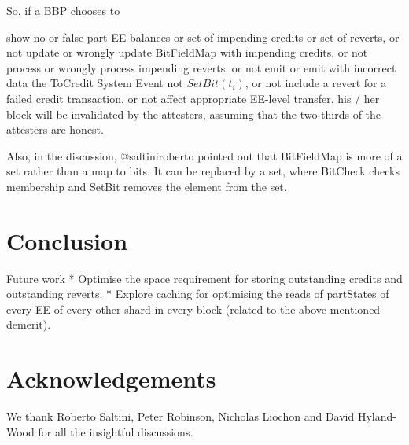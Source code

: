 \documentclass{article}
\begin{document}
So, if a BBP chooses to

show no or false
part EE-balances or
set of impending credits or
set of reverts, or
not update or wrongly update BitFieldMap with impending credits, or
not process or wrongly process impending reverts, or
not emit or emit with incorrect data the ToCredit System Event
not $SetBit(t_i)$, or
not include a revert for a failed credit transaction, or
not affect appropriate EE-level transfer,
his / her block will be invalidated by the attesters, assuming that the two-thirds of the attesters are honest.

Also, in the discussion, @saltiniroberto pointed out that BitFieldMap is more of a set rather than a map to bits. It can be replaced by a set, where BitCheck checks membership and SetBit removes the element from the set.

\section{Conclusion}
Future work
* Optimise the space requirement for storing outstanding credits and outstanding reverts.
* Explore caching for optimising the reads of partStates of every EE of every other shard in every block (related to the above mentioned demerit).

\section*{Acknowledgements}
We thank Roberto Saltini, Peter Robinson, Nicholas Liochon and David Hyland-Wood for all the insightful discussions.



\end{document}
